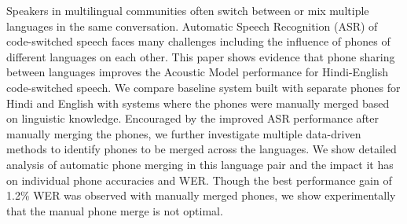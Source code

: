 Speakers in multilingual communities often switch between or mix multiple languages in the same conversation.   Automatic Speech Recognition (ASR) of code-switched speech faces many challenges including the influence of phones of  different languages on each other. This paper shows evidence that phone sharing between languages improves the Acoustic Model performance for Hindi-English code-switched speech. We compare baseline system built with separate phones for Hindi and English with systems where the phones were manually merged based on linguistic knowledge. Encouraged by the improved  ASR performance after manually merging the phones, we further investigate multiple data-driven methods to identify phones to be merged across  the languages. We show detailed analysis of automatic phone merging in this language pair and the impact it has on individual phone accuracies and WER. Though the best performance gain of 1.2\% WER was observed with manually merged phones, we show experimentally that the manual phone merge is not optimal.

